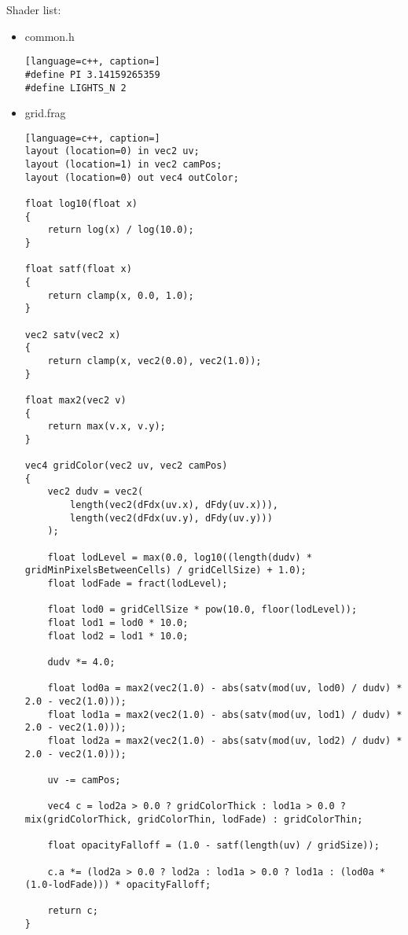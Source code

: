 Shader list:
\begin{itemize}
    \item common.h
\begin{lstlisting}[language=c++, caption=]
#define PI 3.14159265359
#define LIGHTS_N 2
\end{lstlisting}
    \item grid.frag
\begin{lstlisting}[language=c++, caption=]
layout (location=0) in vec2 uv;
layout (location=1) in vec2 camPos;
layout (location=0) out vec4 outColor;

float log10(float x)
{
    return log(x) / log(10.0);
}

float satf(float x)
{
    return clamp(x, 0.0, 1.0);
}

vec2 satv(vec2 x)
{
    return clamp(x, vec2(0.0), vec2(1.0));
}

float max2(vec2 v)
{
    return max(v.x, v.y);
}

vec4 gridColor(vec2 uv, vec2 camPos)
{
    vec2 dudv = vec2(
        length(vec2(dFdx(uv.x), dFdy(uv.x))),
        length(vec2(dFdx(uv.y), dFdy(uv.y)))
    );

    float lodLevel = max(0.0, log10((length(dudv) * gridMinPixelsBetweenCells) / gridCellSize) + 1.0);
    float lodFade = fract(lodLevel);

    float lod0 = gridCellSize * pow(10.0, floor(lodLevel));
    float lod1 = lod0 * 10.0;
    float lod2 = lod1 * 10.0;

    dudv *= 4.0;

    float lod0a = max2(vec2(1.0) - abs(satv(mod(uv, lod0) / dudv) * 2.0 - vec2(1.0)));
    float lod1a = max2(vec2(1.0) - abs(satv(mod(uv, lod1) / dudv) * 2.0 - vec2(1.0)));
    float lod2a = max2(vec2(1.0) - abs(satv(mod(uv, lod2) / dudv) * 2.0 - vec2(1.0)));

    uv -= camPos;

    vec4 c = lod2a > 0.0 ? gridColorThick : lod1a > 0.0 ? mix(gridColorThick, gridColorThin, lodFade) : gridColorThin;

    float opacityFalloff = (1.0 - satf(length(uv) / gridSize));

    c.a *= (lod2a > 0.0 ? lod2a : lod1a > 0.0 ? lod1a : (lod0a * (1.0-lodFade))) * opacityFalloff;

    return c;
}


\end{lstlisting}
\end{itemize}
